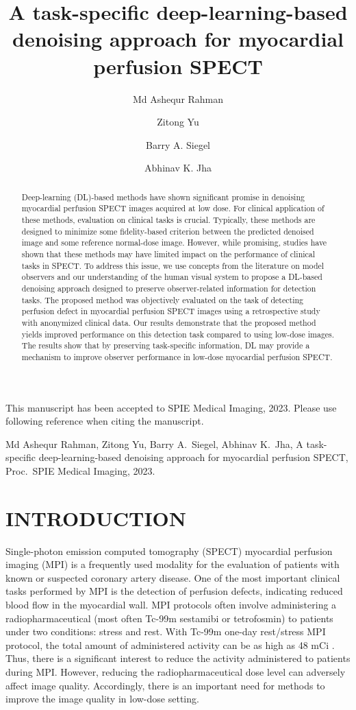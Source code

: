 \documentclass[]{spie}  %
\title{A task-specific deep-learning-based denoising approach for myocardial perfusion SPECT}
\author[a]{Md Ashequr Rahman}
\author[a]{Zitong Yu}
\author[b]{Barry A. Siegel}
\author[a,b]{Abhinav K. Jha}
\affil[a]{Department of Biomedical Engineering, Washington University in St. Louis, St. Louis, MO, USA}
\affil[b]{Mallinckrodt Institute of Radiology, Washington University in St. Louis, St. Louis, MO, USA}
\begin{document}
This manuscript has been accepted to SPIE Medical Imaging, 2023. Please use following reference when citing the manuscript.

Md Ashequr Rahman, Zitong Yu, Barry A.~Siegel, Abhinav K.~Jha, A task-specific deep-learning-based
denoising approach for myocardial perfusion SPECT, Proc.~SPIE Medical Imaging, 2023.
\clearpage
\maketitle

\begin{abstract}
Deep-learning (DL)-based methods have shown significant promise in denoising myocardial perfusion SPECT images acquired at low dose. For clinical application of these methods, evaluation on clinical tasks is crucial. Typically, these methods are designed to minimize some fidelity-based criterion between the predicted denoised image and some reference normal-dose image. However, while promising, studies have shown that these methods may have limited impact on the performance of clinical tasks in SPECT. To address this issue, we use concepts from the literature on model observers and our understanding of the human visual system to propose a DL-based denoising approach designed to preserve observer-related information for detection tasks. The proposed method was objectively evaluated on the task of detecting perfusion defect in myocardial perfusion SPECT images using a retrospective study with anonymized clinical data. Our results demonstrate that the proposed method yields improved performance on this detection task compared to using low-dose images. The results show that by preserving task-specific information, DL may provide a mechanism to improve observer performance in low-dose myocardial perfusion SPECT.
\end{abstract}


\section{INTRODUCTION}
\label{sec:intro}  %
Single-photon emission computed tomography (SPECT) myocardial perfusion imaging (MPI) is a frequently used modality for the evaluation of patients with known or suspected coronary artery disease. One of the most important clinical tasks performed by MPI is the detection of perfusion defects, indicating reduced blood flow in the myocardial wall. MPI protocols often involve administering a radiopharmaceutical (most often Tc-99m sestamibi or tetrofosmin) to patients under two conditions: stress and rest. With Tc-99m one-day rest/stress MPI protocol, the total amount of administered activity can be as high as 48 mCi \cite{henzlova2016asnc}. Thus, there is a significant interest to reduce the activity administered to patients during MPI. However, reducing the radiopharmaceutical dose level can adversely affect image quality. Accordingly, there is an important need for methods to improve the image quality in low-dose setting.
\end{document}
